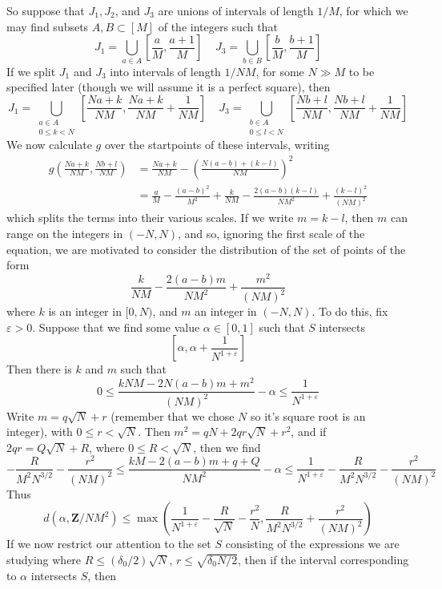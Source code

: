 \documentclass{report}
\theoremstyle{plain}
\theoremstyle{plain}
\begin{document}
So suppose that $J_1,J_2$, and $J_3$ are unions of intervals of length $1/M$, for which we may find subsets $A,B \subset [M]$ of the integers such that
%
\[ J_1 = \bigcup_{a \in A} \left[\frac{a}{M}, \frac{a + 1}{M} \right]\ \ \ \ \ J_3 = \bigcup_{b \in B} \left[ \frac{b}{M} , \frac{b + 1}{M} \right] \]
%
If we split $J_1$ and $J_3$ into intervals of length $1/NM$, for some $N \gg M$ to be specified later (though we will assume it is a perfect square), then
%
\[ J_1 = \bigcup_{\substack{a \in A\\0 \leq k < N}} \left[ \frac{Na + k}{NM}, \frac{Na + k}{NM} + \frac{1}{NM} \right]\ \ \ \ \ J_3 = \bigcup_{\substack{b \in A\\0 \leq l < N}} \left[ \frac{Nb + l}{NM}, \frac{Nb + l}{NM} + \frac{1}{NM} \right] \]
%
We now calculate $g$ over the startpoints of these intervals, writing
%
\begin{align*}
    g \left( \frac{Na + k}{NM}, \frac{Nb + l}{NM} \right) &= \frac{Na + k}{NM} - \left( \frac{N(a - b) + (k-l)}{NM} \right)^2\\
    &= \frac{a}{M} - \frac{(a-b)^2}{M^2} + \frac{k}{NM} - \frac{2(a-b)(k-l)}{NM^2} + \frac{(k-l)^2}{(NM)^2}
\end{align*}
%
which splits the terms into their various scales. If we write $m = k - l$, then $m$ can range on the integers in $(-N,N)$, and so, ignoring the first scale of the equation, we are motivated to consider the distribution of the set of points of the form
%
\[ \frac{k}{NM} - \frac{2(a-b)m}{NM^2} + \frac{m^2}{(NM)^2} \]
%
where $k$ is an integer in $[0,N)$, and $m$ an integer in $(-N,N)$. To do this, fix $\varepsilon > 0$. Suppose that we find some value $\alpha \in [0,1]$ such that $S$ intersects
%
\[ \left[ \alpha , \alpha + \frac{1}{N^{1 + \varepsilon}} \right] \]
%
Then there is $k$ and $m$ such that
%
\[ 0 \leq \frac{kNM - 2N(a-b)m + m^2}{(NM)^2} - \alpha \leq \frac{1}{N^{1 + \varepsilon}} \]
%
Write $m = q \sqrt{N} + r$ (remember that we chose $N$ so it's square root is an integer), with $0 \leq r < \sqrt{N}$. Then $m^2 = qN + 2qr \sqrt{N} + r^2$, and if $2qr = Q\sqrt{N} + R$, where $0 \leq R < \sqrt{N}$, then we find
%
\[ -\frac{R}{M^2 N^{3/2}} - \frac{r^2}{(NM)^2} \leq \frac{kM - 2(a-b)m + q + Q}{NM^2} - \alpha \leq \frac{1}{N^{1 + \varepsilon}} - \frac{R}{M^2 N^{3/2}} - \frac{r^2}{(NM)^2} \]
%
Thus
%
\[ d(\alpha, \mathbf{Z}/NM^2) \leq \max \left( \frac{1}{N^{1+\varepsilon}} - \frac{R}{\sqrt{N}} - \frac{r^2}{N}, \frac{R}{M^2 N^{3/2}} + \frac{r^2}{(NM)^2} \right) \]
%
If we now restrict our attention to the set $S$ consisting of the expressions we are studying where $R \leq (\delta_0/2) \sqrt{N}$, $r \leq \sqrt{\delta_0 N/2}$, then if the interval corresponding to $\alpha$ intersects $S$, then
\end{document}

